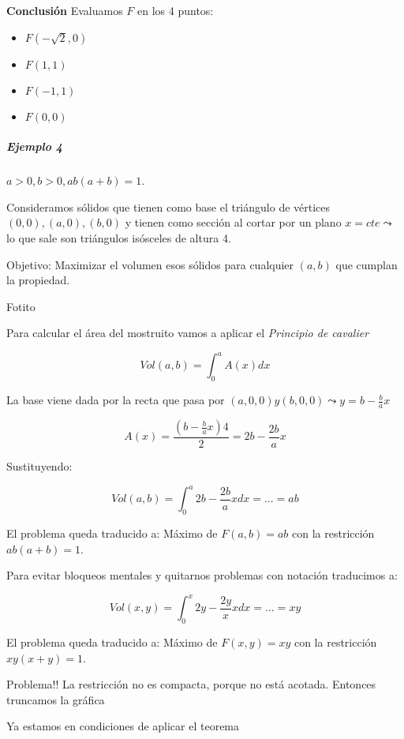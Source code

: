 \textbf{Conclusión} Evaluamos $F$ en los 4 puntos:

\begin{itemize}
\item $F(-\sqrt{2},0)$
\item $F(1,1)$
\item $F(-1,1)$
\item $F(0,0)$
\end{itemize}

\subparagraph{Ejemplo 4}

\begin{problem}[?]

$a>0,b>0, ab(a+b) = 1$.

Consideramos sólidos que tienen como base el triángulo de vértices $(0,0),(a,0),(b,0)$ y tienen como sección al cortar por un plano $x=cte \leadsto$ lo que sale son triángulos isósceles de altura 4.

Objetivo: Maximizar el volumen esos sólidos para cualquier $(a,b)$ que cumplan la propiedad.
\solution

Fotito


Para calcular el área del mostruito vamos a aplicar el \textit{Principio de cavalier} %

\[Vol(a,b) = \int_0^a A(x)dx\]

La base viene dada por la recta que pasa por $(a,0,0) y (b,0,0) \leadsto y=b-\frac{b}{a}x$

\[A(x) = \displaystyle \frac{\left(b-\frac{b}{a}x\right)4}{2} = 2b - \frac{2b}{a}x\]

Sustituyendo:


\[Vol(a,b) = \int_0^a 2b-\frac{2b}{a}xdx = ... = ab\]

El problema queda traducido a: Máximo de $F(a,b) = ab$ con la restricción $ab(a+b)=1$.

Para evitar bloqueos mentales y quitarnos problemas con notación traducimos a:

\[Vol(x,y) = \int_0^x 2y-\frac{2y}{x}xdx = ... = xy\]

El problema queda traducido a: Máximo de $F(x,y) = xy$ con la restricción $xy(x+y)=1$.

Problema!! La restricción no es compacta, porque no está acotada. Entonces truncamos la gráfica

Ya estamos en condiciones de aplicar el teorema


\end{problem}
